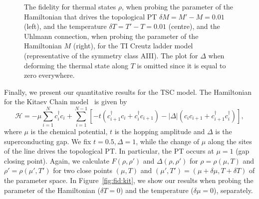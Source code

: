 \begin{figure}[h!]
\begin{minipage}{0.32\textwidth}
\end{minipage}
\caption{The fidelity for thermal states $\rho$, when probing the parameter of the Hamiltonian that drives the topological PT $\delta M =M'-M=0.01$ (left), and the temperature $\delta T=T'-T=0.01$ (centre), and the Uhlmann connection, when probing the parameter of the Hamiltonian $M$ (right), for the TI Creutz ladder model (representative of the symmetry class AIII). The plot for $\Delta$ when deforming the thermal state along $T$ is omitted since it is equal to zero everywhere.}
\label{fig:fid:cl}
\end{figure}

Finally, we present our quantitative results for the TSC model. The Hamiltonian for the Kitaev Chain model~\cite{kit:cha:01} is given by
\begin{equation}
\mathcal{H}=-\mu\sum_{i=1}^N c^{\dagger}_i c_i+\sum_{i=1}^{N-1}\left[-t(c^{\dagger}_{i+1}c_i+c^{\dagger}_ic_{i+1})-|\Delta|(c_ic_{i+1}+c^{\dagger}_{i+1}c^{\dagger}_i)\right],
\end{equation}
 where $\mu$ is the chemical potential, $t$ is the hopping amplitude and $\Delta$ is the superconducting gap. 
 We fix $t=0.5,\Delta=1$, while the change of $\mu$ along the sites of the line drives the topological PT. In particular, the PT occurs at $\mu=1$ (gap closing point). Again, we calculate $F(\rho,\rho')$ and $\Delta(\rho,\rho')$ for $\rho=\rho(\mu,T)$ and $\rho'=\rho(\mu',T')$ for two close points $(\mu,T)$ and $(\mu',T')=(\mu+\delta \mu, T+\delta T)$ of the parameter space. In Figure~\ref{fig:fid:kit}, we show our results when probing the parameter of the Hamiltonian ($\delta T = 0$) and the temperature ($\delta \mu = 0$), separately.
  
